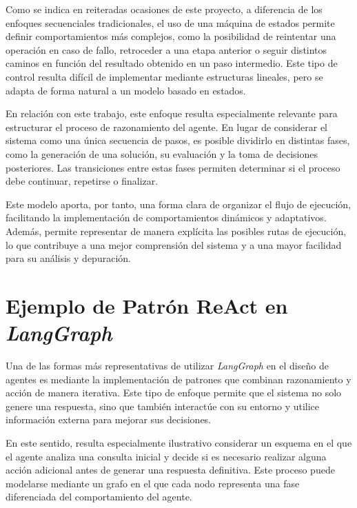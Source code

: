 \documentclass[12pt,a4paper,twoside,openright]{book}
\begin{document}
Como se indica en reiteradas ocasiones de este proyecto, a diferencia de los enfoques secuenciales tradicionales, el uso de una máquina de estados permite definir comportamientos más complejos, como
la posibilidad de reintentar una operación en caso de fallo, retroceder a una etapa anterior o seguir distintos caminos en función del resultado obtenido en un paso intermedio. Este tipo de control
resulta difícil de implementar mediante estructuras lineales, pero se adapta de forma natural a un modelo basado en estados.

En relación con este trabajo, este enfoque resulta especialmente relevante para estructurar el proceso de razonamiento del agente. En lugar de considerar el sistema como una única secuencia de pasos,
es posible dividirlo en distintas fases, como la generación de una solución, su evaluación y la toma de decisiones posteriores. Las transiciones entre estas fases permiten determinar si el proceso debe
continuar, repetirse o finalizar. \cite{harel1987statecharts}

Este modelo aporta, por tanto, una forma clara de organizar el flujo de ejecución, facilitando la implementación de comportamientos dinámicos y adaptativos. Además, permite representar de manera explícita
las posibles rutas de ejecución, lo que contribuye a una mejor comprensión del sistema y a una mayor facilidad para su análisis y depuración.


\section{Ejemplo de Patrón ReAct en \emph{LangGraph}}

Una de las formas más representativas de utilizar \emph{LangGraph} en el diseño de agentes es mediante la implementación de patrones que combinan razonamiento y acción de manera iterativa. Este tipo de
enfoque permite que el sistema no solo genere una respuesta, sino que también interactúe con su entorno y utilice información externa para mejorar sus decisiones. \cite{yao2023react}

En este sentido, resulta especialmente ilustrativo considerar un esquema en el que el agente analiza una consulta inicial y decide si es necesario realizar alguna acción adicional antes de generar una
respuesta definitiva. Este proceso puede modelarse mediante un grafo en el que cada nodo representa una fase diferenciada del comportamiento del agente.
\end{document}
